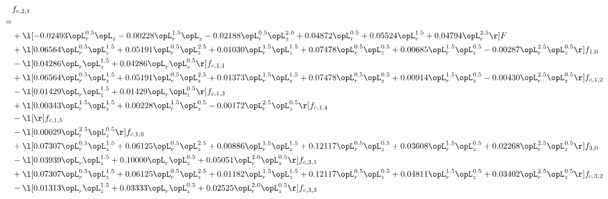 \begin{alignat}{2} 
\label{eq:f_21_1} 
& f_{c,2,1} \nonumber \\ 
 = \\ 
& + \l[  -0.02493 \opL_r^{0.5} \opL_z   -0.00228 \opL_r^{1.5} \opL_z   -0.02188 \opL_r^{0.5} \opL_z^{2.0} +  0.04872 \opL_r^{0.5} +  0.05524 \opL_r^{1.5} +  0.04794 \opL_r^{2.5}  \r] F \nonumber \\ 
& + \l[  0.06564 \opL_r^{0.5} \opL_z^{1.5} +  0.05191 \opL_r^{0.5} \opL_z^{2.5} +  0.01030 \opL_r^{1.5} \opL_z^{1.5} +  0.07478 \opL_r^{0.5} \opL_z^{0.5} +  0.00685 \opL_r^{1.5} \opL_z^{0.5}   -0.00287 \opL_r^{2.5} \opL_z^{0.5}  \r] f_{1,0} \nonumber \\ 
& - \l[  0.04286 \opL_r \opL_z^{1.5} +  0.04286 \opL_r \opL_z^{0.5}  \r] f_{c,1,1} \nonumber \\ 
& + \l[  0.06564 \opL_r^{0.5} \opL_z^{1.5} +  0.05191 \opL_r^{0.5} \opL_z^{2.5} +  0.01373 \opL_r^{1.5} \opL_z^{1.5} +  0.07478 \opL_r^{0.5} \opL_z^{0.5} +  0.00914 \opL_r^{1.5} \opL_z^{0.5}   -0.00430 \opL_r^{2.5} \opL_z^{0.5}  \r] f_{c,1,2} \nonumber \\ 
& - \l[  0.01429 \opL_r \opL_z^{1.5} +  0.01429 \opL_r \opL_z^{0.5}  \r] f_{c,1,3} \nonumber \\ 
& + \l[  0.00343 \opL_r^{1.5} \opL_z^{1.5} +  0.00228 \opL_r^{1.5} \opL_z^{0.5}   -0.00172 \opL_r^{2.5} \opL_z^{0.5}  \r] f_{c,1,4} \nonumber \\ 
& - \l[  \r] f_{c,1,5} \nonumber \\ 
& - \l[  0.00029 \opL_r^{2.5} \opL_z^{0.5}  \r] f_{c,1,6} \nonumber \\ 
& + \l[  0.07307 \opL_r^{0.5} \opL_z^{1.5} +  0.06125 \opL_r^{0.5} \opL_z^{2.5} +  0.00886 \opL_r^{1.5} \opL_z^{1.5} +  0.12117 \opL_r^{0.5} \opL_z^{0.5} +  0.03608 \opL_r^{1.5} \opL_z^{0.5} +  0.02268 \opL_r^{2.5} \opL_z^{0.5}  \r] f_{3,0} \nonumber \\ 
& - \l[  0.03939 \opL_r \opL_z^{1.5} +  0.10000 \opL_r \opL_z^{0.5} +  0.05051 \opL_r^{2.0} \opL_z^{0.5}  \r] f_{c,3,1} \nonumber \\ 
& + \l[  0.07307 \opL_r^{0.5} \opL_z^{1.5} +  0.06125 \opL_r^{0.5} \opL_z^{2.5} +  0.01182 \opL_r^{1.5} \opL_z^{1.5} +  0.12117 \opL_r^{0.5} \opL_z^{0.5} +  0.04811 \opL_r^{1.5} \opL_z^{0.5} +  0.03402 \opL_r^{2.5} \opL_z^{0.5}  \r] f_{c,3,2} \nonumber \\ 
& - \l[  0.01313 \opL_r \opL_z^{1.5} +  0.03333 \opL_r \opL_z^{0.5} +  0.02525 \opL_r^{2.0} \opL_z^{0.5}  \r] f_{c,3,3} \nonumber \\ 

\end{alignat}
